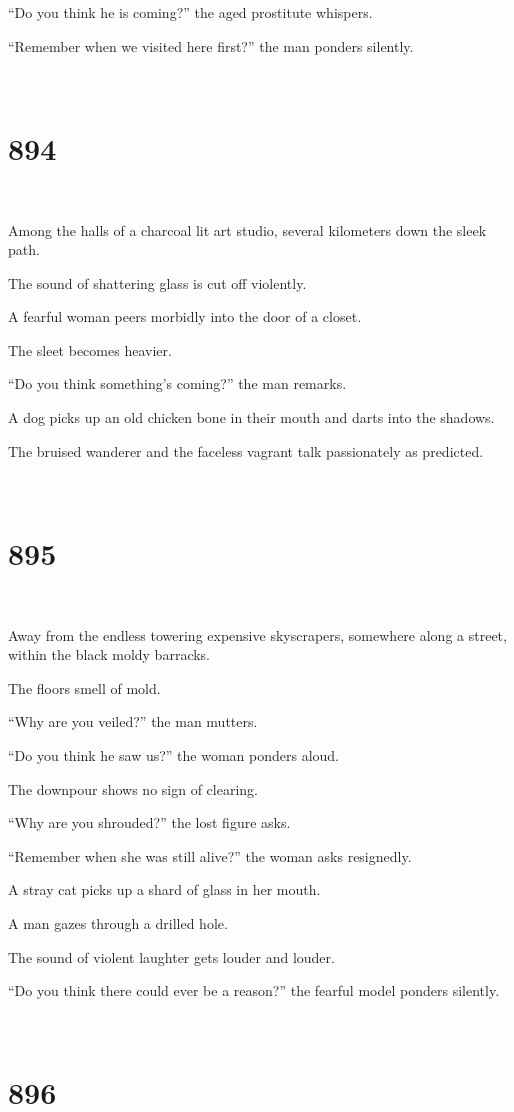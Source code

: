 \documentclass{report}
\begin{document}
``Do you think he is coming?'' the aged prostitute whispers.

``Remember when we visited here first?'' the man ponders silently.

~
\chapter*{894}
~

Among the halls of a charcoal lit art studio, several kilometers down the sleek path.

The sound of shattering glass is cut off violently.

A fearful woman peers morbidly into the door of a closet.

The sleet becomes heavier.

``Do you think something's coming?'' the man remarks.

A dog picks up an old chicken bone in their mouth and darts into the shadows.

The bruised wanderer and the faceless vagrant talk passionately as predicted.

~
\chapter*{895}
~

Away from the endless towering expensive skyscrapers, somewhere along a street, within the black moldy barracks.

The floors smell of mold.

``Why are you veiled?'' the man mutters.

``Do you think he saw us?'' the woman ponders aloud.

The downpour shows no sign of clearing.

``Why are you shrouded?'' the lost figure asks.

``Remember when she was still alive?'' the woman asks resignedly.

A stray cat picks up a shard of glass in her mouth.

A man gazes through a drilled hole.

The sound of violent laughter gets louder and louder.

``Do you think there could ever be a reason?'' the fearful model ponders silently.

~
\chapter*{896}
~
\end{document}
